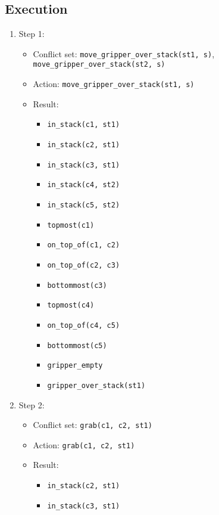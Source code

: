\documentclass[12pt]{article}
\begin{document}
\subsection{Execution}
\begin{enumerate}
  \item Step 1:
    \begin{itemize}
      \item Conflict set: \texttt{move\_gripper\_over\_stack(st1, s)}, \texttt{move\_gripper\_over\_stack(st2, s)}
      \item Action: \texttt{move\_gripper\_over\_stack(st1, s)}
      \item Result:
        \begin{itemize}
          \item \texttt{in\_stack(c1, st1)}
          \item \texttt{in\_stack(c2, st1)}
          \item \texttt{in\_stack(c3, st1)}
          \item \texttt{in\_stack(c4, st2)}
          \item \texttt{in\_stack(c5, st2)}
          \item \texttt{topmost(c1)}
          \item \texttt{on\_top\_of(c1, c2)}
          \item \texttt{on\_top\_of(c2, c3)}
          \item \texttt{bottommost(c3)}
          \item \texttt{topmost(c4)}
          \item \texttt{on\_top\_of(c4, c5)}
          \item \texttt{bottommost(c5)}
          \item \texttt{gripper\_empty}
          \item \texttt{gripper\_over\_stack(st1)}
        \end{itemize}
    \end{itemize}
  \item Step 2:
    \begin{itemize}
      \item Conflict set: \texttt{grab(c1, c2, st1)}
      \item Action: \texttt{grab(c1, c2, st1)}
      \item Result:
        \begin{itemize}
          \item \texttt{in\_stack(c2, st1)}
          \item \texttt{in\_stack(c3, st1)}

\end{itemize}
\end{itemize}
\end{enumerate}
\end{document}
